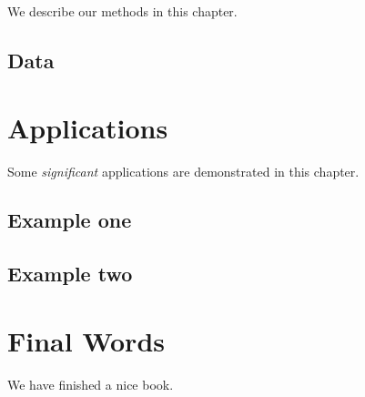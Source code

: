 \documentclass[]{elsarticle} %
\begin{document}
We describe our methods in this chapter.

\hypertarget{data}{%
\subsection{Data}\label{data}}

\hypertarget{applications}{%
\section{Applications}\label{applications}}

Some \emph{significant} applications are demonstrated in this chapter.

\hypertarget{example-one}{%
\subsection{Example one}\label{example-one}}

\hypertarget{example-two}{%
\subsection{Example two}\label{example-two}}

\hypertarget{final-words}{%
\section{Final Words}\label{final-words}}

We have finished a nice book.


\end{document}
